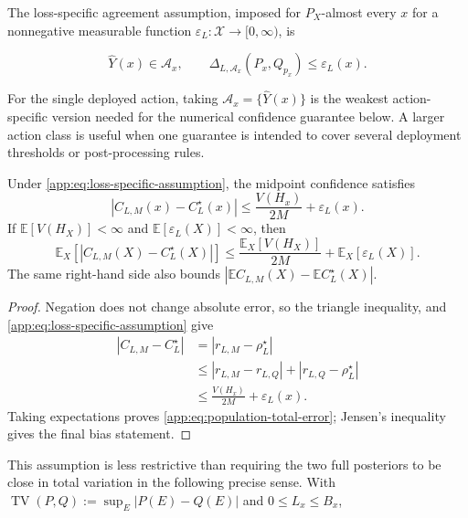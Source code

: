 The loss-specific agreement assumption, imposed for $P_X$-almost every $x$ for
a nonnegative measurable function
$\varepsilon_L:\mathcal X\to[0,\infty)$, is

\begin{equation}
  \widehat Y(x)\in\mathcal{A}_x,
  \qquad
  \Delta_{L,\mathcal{A}_x}(P_x,Q_{p_x})
  \leq\varepsilon_L(x).
  \label{app:eq:loss-specific-assumption}
\end{equation}

For the single deployed action, taking
$\mathcal{A}_x=\{\widehat Y(x)\}$ is the weakest action-specific version
needed for the numerical confidence guarantee below.  A larger action
class is useful when one guarantee is intended to cover several
deployment thresholds or post-processing rules.

\begin{proposition}
\label{app:prop:total-error}
Under \cref{app:eq:loss-specific-assumption}, the midpoint confidence
satisfies
\begin{equation}
  \left|C_{L,M}(x)-C_L^\star(x)\right|
  \leq
  \frac{V(H_x)}{2M}+\varepsilon_L(x).
  \label{app:eq:pointwise-total-error}
\end{equation}
If $\mathbb{E}[V(H_X)]<\infty$ and
$\mathbb{E}[\varepsilon_L(X)]<\infty$, then
\begin{equation}
  \mathbb{E}_X\!\left[
    |C_{L,M}(X)-C_L^\star(X)|\right]
  \leq
  \frac{\mathbb{E}_X[V(H_X)]}{2M}
  +\mathbb{E}_X[\varepsilon_L(X)].
  \label{app:eq:population-total-error}
\end{equation}
The same right-hand side also bounds
$|\mathbb{E}C_{L,M}(X)-\mathbb{E}C_L^\star(X)|$.
\end{proposition}

\begin{proof}
Negation does not change absolute error, so the triangle inequality,
 and
\cref{app:eq:loss-specific-assumption} give
\begin{align*}
  |C_{L,M}-C_L^\star|
  &=|r_{L,M}-\rho_L^\star|\\
  &\leq |r_{L,M}-r_{L,Q}|
       +|r_{L,Q}-\rho_L^\star|\\
  &\leq \frac{V(H_x)}{2M}+\varepsilon_L(x).
\end{align*}
Taking expectations proves
\cref{app:eq:population-total-error}; Jensen's inequality gives the
final bias statement.
\end{proof}

This assumption is less restrictive than requiring the two full posteriors to
be close in total variation in the following precise sense. With
$\operatorname{TV}(P,Q):=\sup_E|P(E)-Q(E)|$ and
$0\leq L_x\leq B_x$,

